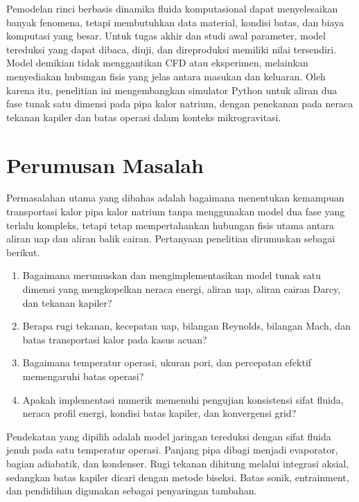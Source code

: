\documentclass[
  12pt,a4paper,oneside]{report}
\providecommand{\tightlist}{%
  \setlength{\itemsep}{0pt}\setlength{\parskip}{0pt}}
\begin{document}
Pemodelan rinci berbasis dinamika fluida komputasional dapat
menyelesaikan banyak fenomena, tetapi membutuhkan data material, kondisi
batas, dan biaya komputasi yang besar. Untuk tugas akhir dan studi awal
parameter, model tereduksi yang dapat dibaca, diuji, dan direproduksi
memiliki nilai tersendiri. Model demikian tidak menggantikan CFD atau
eksperimen, melainkan menyediakan hubungan fisis yang jelas antara
masukan dan keluaran. Oleh karena itu, penelitian ini mengembangkan
simulator Python untuk aliran dua fase tunak satu dimensi pada pipa
kalor natrium, dengan penekanan pada neraca tekanan kapiler dan batas
operasi dalam konteks mikrogravitasi.

\hypertarget{perumusan-masalah}{%
\section{Perumusan Masalah}\label{perumusan-masalah}}

Permasalahan utama yang dibahas adalah bagaimana menentukan kemampuan
transportasi kalor pipa kalor natrium tanpa menggunakan model dua fase
yang terlalu kompleks, tetapi tetap mempertahankan hubungan fisis utama
antara aliran uap dan aliran balik cairan. Pertanyaan penelitian
dirumuskan sebagai berikut.

\begin{enumerate}
\def\labelenumi{\arabic{enumi}.}
\tightlist
\item
  Bagaimana merumuskan dan mengimplementasikan model tunak satu dimensi
  yang mengkopelkan neraca energi, aliran uap, aliran cairan Darcy, dan
  tekanan kapiler?
\item
  Berapa rugi tekanan, kecepatan uap, bilangan Reynolds, bilangan Mach,
  dan batas transportasi kalor pada kasus acuan?
\item
  Bagaimana temperatur operasi, ukuran pori, dan percepatan efektif
  memengaruhi batas operasi?
\item
  Apakah implementasi numerik memenuhi pengujian konsistensi sifat
  fluida, neraca profil energi, kondisi batas kapiler, dan konvergensi
  grid?
\end{enumerate}

Pendekatan yang dipilih adalah model jaringan tereduksi dengan sifat
fluida jenuh pada satu temperatur operasi. Panjang pipa dibagi menjadi
evaporator, bagian adiabatik, dan kondenser. Rugi tekanan dihitung
melalui integrasi aksial, sedangkan batas kapiler dicari dengan metode
biseksi. Batas sonik, entrainment, dan pendidihan digunakan sebagai
penyaringan tambahan.
\end{document}
